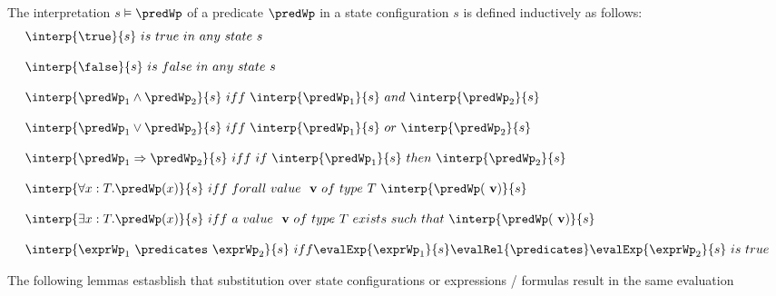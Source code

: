 \begin{interpPred} \label{interpPred} 
The interpretation $ s \vDash \predWp$ of a predicate $\predWp$ in a state configuration $s$ is defined inductively as follows:
$$
\begin{array}{l}
\interp{\true}{s} \  is \ true \ in \ any \ state \ s \\
\\
\interp{\false}{s} \ is \ false \ in \ any \ state \ s \\
\\

\interp{\predWp_1  \wedge  \predWp_2 }{s} \ iff \ \interp{\predWp_1}{s} \ and \ \interp{\predWp_2}{s}  \\
\\

\interp{\predWp_1  \vee  \predWp_2 }{s} \ iff \ \interp{\predWp_1}{s} \ or \ \interp{\predWp_2}{s}  \\
\\
\interp{\predWp_1  \Rightarrow  \predWp_2 }{s} \ iff \ if \ \interp{\predWp_1}{s} \ then \ \interp{\predWp_2}{s}  \\
\\
\interp{\forall x : T .  \predWp(x)   }{s} \ iff \ forall \ value \ \mbox{ \rm \textbf{v}} \ of \  type \  T \ \interp{\predWp(\mbox{ \rm \textbf{v}})}{s}  \\
\\

\interp{\exists x : T .  \predWp(x)   }{s} \ iff \ a \ value \ \mbox{ \rm \textbf{v}} \ of \  type \  T \ exists \ such \ that \ \interp{\predWp(\mbox{ \rm \textbf{v}})}{s}  \\
\\
\interp{\exprWp_1 \  \predicates \  \exprWp_2 }{s} \ iff \evalExp{\exprWp_1 }{s} \evalRel{\predicates }  \evalExp{\exprWp_2 }{s} \ is  \ true
\end{array}
$$   
\end{interpPred}


The following lemmas estasblish that substitution over state configurations or expressions / formulas result in the same evaluation


